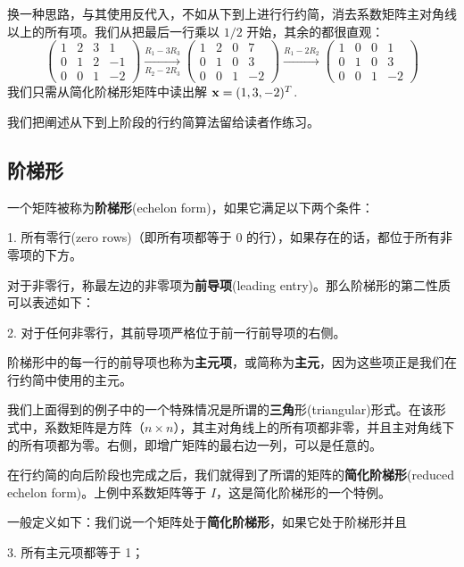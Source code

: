 换一种思路，与其使用反代入，不如从下到上进行行约简，消去系数矩阵主对角线以上的所有项。我们从把最后一行乘以 $1/2$ 开始，其余的都很直观：
$$
\left(\begin{array}{ccc|c} 1 & 2 & 3 & 1 \\ 0 & 1 & 2 & -1 \\ 0 & 0 & 1 & -2 \end{array}\right)
\xrightarrow[R_2-2R_3]{R_1-3R_3} \left(\begin{array}{ccc|c} 1 & 2 & 0 & 7 \\ 0 & 1 & 0 & 3 \\ 0 & 0 & 1 & -2 \end{array}\right)
\xrightarrow{R_1-2R_2} \left(\begin{array}{ccc|c} 1 & 0 & 0 & 1 \\ 0 & 1 & 0 & 3 \\ 0 & 0 & 1 & -2 \end{array}\right)
$$
我们只需从简化阶梯形矩阵中读出解 $\mathbf{x} = (1, 3, -2)^T$. ~

我们把阐述从下到上阶段的行约简算法留给读者作练习。

\subsection{阶梯形}\label{sec:02-02-03}

一个矩阵被称为\textbf{阶梯形}(echelon form)，如果它满足以下两个条件：

1. 所有零行(zero rows)（即所有项都等于 0 的行），如果存在的话，都位于所有非零项的下方。

对于非零行，称最左边的非零项为\textbf{前导项}(leading entry)。那么阶梯形的第二性质可以表述如下：

2. 对于任何非零行，其前导项严格位于前一行前导项的右侧。

阶梯形中的每一行的前导项也称为\textbf{主元项}，或简称为\textbf{主元}，因为这些项正是我们在行约简中使用的主元。

我们上面得到的例子中的一个特殊情况是所谓的\textbf{三角}形(triangular)形式。在该形式中，系数矩阵是方阵（$n \times n$），其主对角线上的所有项都非零，并且主对角线下的所有项都为零。右侧，即增广矩阵的最右边一列，可以是任意的。

在行约简的向后阶段也完成之后，我们就得到了所谓的矩阵的\textbf{简化阶梯形}(reduced echelon form)。上例中系数矩阵等于 $I$，这是简化阶梯形的一个特例。

一般定义如下：我们说一个矩阵处于\textbf{简化阶梯形}，如果它处于阶梯形并且

3. 所有主元项都等于 1；


